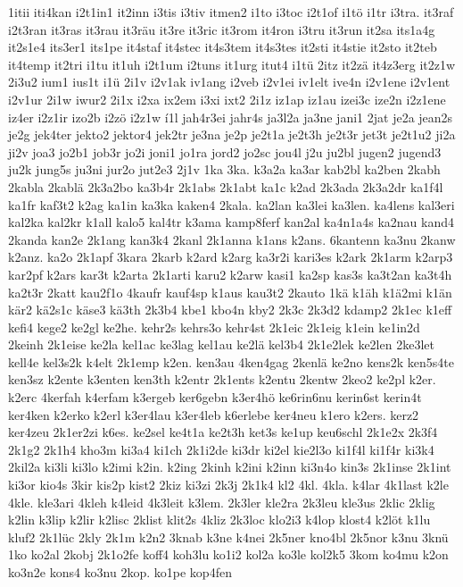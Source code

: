 {1itii
iti4kan
i2t1in1
it2inn
i3tis
i3tiv
itmen2
i1to
i3toc
i2t1of
i1tö
i1tr
i3tra.
it3raf
i2t3ran
it3ras
it3rau
it3räu
it3re
it3ric
it3rom
it4ron
i3tru
it3run
it2sa
its1a4g
it2s1e4
its3er1
its1pe
it4staf
it4stec
it4s3tem
it4s3tes
it2sti
it4stie
it2sto
it2teb
it4temp
it2tri
i1tu
it1uh
i2t1um
i2tuns
it1urg
itut4
i1tü
2itz
it2zä
it4z3erg
it2z1w
2i3u2
ium1
ius1t
i1ü
2i1v
i2v1ak
iv1ang
i2veb
i2v1ei
iv1elt
ive4n
i2v1ene
i2v1ent
i2v1ur
2i1w
iwur2
2i1x
i2xa
ix2em
i3xi
ixt2
2i1z
iz1ap
iz1au
izei3c
ize2n
i2z1ene
iz4er
i2z1ir
izo2b
i2zö
i2z1w
í1l
jah4r3ei
jahr4s
ja3l2a
ja3ne
jani1
2jat
je2a
jean2s
je2g
jek4ter
jekto2
jektor4
jek2tr
je3na
je2p
je2t1a
je2t3h
je2t3r
jet3t
je2t1u2
ji2a
ji2v
joa3
jo2b1
job3r
jo2i
joni1
jo1ra
jord2
jo2sc
jou4l
j2u
ju2bl
jugen2
jugend3
ju2k
jung5s
ju3ni
jur2o
jut2e3
2j1v
1ka
3ka.
k3a2a
ka3ar
kab2bl
ka2ben
2kabh
2kabla
2kablä
2k3a2bo
ka3b4r
2k1abs
2k1abt
ka1c
k2ad
2k3ada
2k3a2dr
ka1f4l
ka1fr
kaf3t2
k2ag
ka1in
ka3ka
kaken4
2kala.
ka2lan
ka3lei
ka3len.
ka4lens
kal3eri
kal2ka
kal2kr
k1all
kalo5
kal4tr
k3ama
kamp8ferf
kan2al
ka4n1a4s
ka2nau
kand4
2kanda
kan2e
2k1ang
kan3k4
2kanl
2k1anna
k1ans
k2ans.
6kantenn
ka3nu
2kanw
k2anz.
ka2o
2k1apf
3kara
2karb
k2ard
k2arg
ka3r2i
kari3es
k2ark
2k1arm
k2arp3
kar2pf
k2ars
kar3t
k2arta
2k1arti
karu2
k2arw
kasi1
ka2sp
kas3s
ka3t2an
ka3t4h
ka2t3r
2katt
kau2f1o
4kaufr
kauf4sp
k1aus
kau3t2
2kauto
1kä
k1äh
k1ä2mi
k1än
kär2
kä2s1c
käse3
kä3th
2k3b4
kbe1
kbo4n
kby2
2k3c
2k3d2
kdamp2
2k1ec
k1eff
kefi4
kege2
ke2gl
ke2he.
kehr2s
kehrs3o
kehr4st
2k1eic
2k1eig
k1ein
ke1in2d
2keinh
2k1eise
ke2la
kel1ac
ke3lag
kel1au
ke2lä
kel3b4
2k1e2lek
ke2len
2ke3let
kell4e
kel3s2k
k4elt
2k1emp
k2en.
ken3au
4ken4gag
2kenlä
ke2no
kens2k
ken5s4te
ken3sz
k2ente
k3enten
ken3th
k2entr
2k1ents
k2entu
2kentw
2keo2
ke2pl
k2er.
k2erc
4kerfah
k4erfam
k3ergeb
ker6gebn
k3er4hö
ke6rin6nu
kerin6st
kerin4t
ker4ken
k2erko
k2erl
k3er4lau
k3er4leb
k6erlebe
ker4neu
k1ero
k2ers.
kerz2
ker4zeu
2k1er2zi
k6es.
ke2sel
ke4t1a
ke2t3h
ket3s
ke1up
keu6schl
2k1e2x
2k3f4
2k1g2
2k1h4
kho3m
ki3a4
ki1ch
2k1i2de
ki3dr
ki2el
kie2l3o
ki1f4l
ki1f4r
ki3k4
2kil2a
ki3li
ki3lo
k2imi
k2in.
k2ing
2kinh
k2ini
k2inn
ki3n4o
kin3s
2k1inse
2k1int
ki3or
kio4s
3kir
kis2p
kist2
2kiz
ki3zi
2k3j
2k1k4
kl2
4kl.
4kla.
k4lar
4k1last
k2le
4kle.
kle3ari
4kleh
k4leid
4k3leit
k3lem.
2k3ler
kle2ra
2k3leu
kle3us
2klic
2klig
k2lin
k3lip
k2lir
k2lisc
2klist
klit2s
4kliz
2k3loc
klo2i3
k4lop
klost4
k2löt
k1lu
kluf2
2k1lüc
2kly
2k1m
k2n2
3knab
k3ne
k4nei
2k5ner
kno4bl
2k5nor
k3nu
3knü
1ko
ko2al
2kobj
2k1o2fe
koff4
koh3lu
ko1i2
kol2a
ko3le
kol2k5
3kom
ko4mu
k2on
ko3n2e
kons4
ko3nu
2kop.
ko1pe
kop4fen
}
